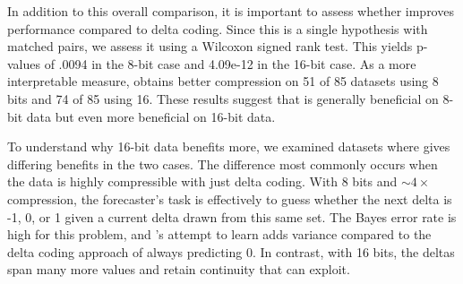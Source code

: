 In addition to this overall comparison, it is important to assess whether \fire improves performance compared to delta coding. Since this is a single hypothesis with matched pairs, we assess it using a Wilcoxon signed rank test. This yields p-values of .0094 in the 8-bit case and 4.09e-12 in the 16-bit case. As a more interpretable measure, \fire obtains better compression on 51 of 85 datasets using 8 bits and 74 of 85 using 16. These results suggest that \fire is generally beneficial on 8-bit data but even more beneficial on 16-bit data.

To understand why 16-bit data benefits more, we examined datasets where \fire gives differing benefits in the two cases. The difference most commonly occurs when the data is highly compressible with just delta coding. With 8 bits and $\sim$$4\times$ compression, the forecaster's task is effectively to guess whether the next delta is -1, 0, or 1 given a current delta drawn from this same set. The Bayes error rate is high for this problem, and \justfire's attempt to learn adds variance compared to the delta coding approach of always predicting 0. In contrast, with 16 bits, the deltas span many more values and retain continuity that \fire can exploit.








